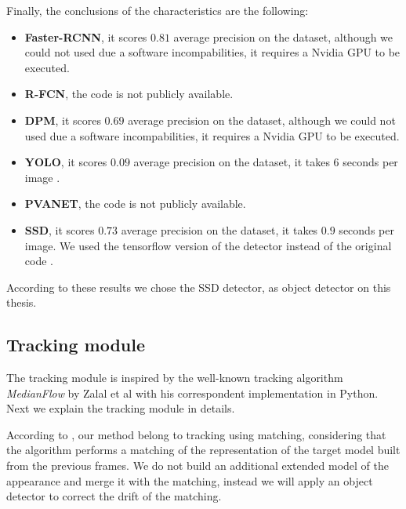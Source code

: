 Finally, the conclusions of the characteristics are the following:

\begin{itemize}

\item \textbf{Faster-RCNN}, it scores $0.81$ average precision on the dataset, although we could not used due a software incompabilities, it requires a Nvidia GPU to be executed.

\item \textbf{R-FCN}, the code is not publicly available.

\item \textbf{DPM}, it scores $0.69$ average precision on the dataset, although we could not used due a software incompabilities, it requires a Nvidia GPU to be executed.

\item \textbf{YOLO}, it scores $0.09$ average precision on the dataset, it takes $6$ seconds per image \cite{yoloDark}. 

\item \textbf{PVANET}, the code is not publicly available.

\item \textbf{SSD}, it scores $0.73$ average precision on the dataset, it takes $0.9$ seconds per image. We used the tensorflow version of the detector \cite{ssdCode} instead of the original code \cite{ssdCode2}.


\end{itemize}

According to these results we chose the SSD detector, as object detector on this thesis.

\subsection{Tracking module}


The tracking module is inspired by the well-known tracking algorithm \textit{MedianFlow} by Zalal et al\cite{medianFlow} with his correspondent implementation in Python\cite{medianFlowPython}. Next we explain the tracking module in details.

According to \cite{visualTrackingSurvey}, our method belong to tracking using matching, considering that the algorithm performs a matching of the representation of the target model built from the previous frames. We do not build an additional extended model of the appearance and merge it with the matching, instead we will apply an object detector to correct the drift of the matching.


